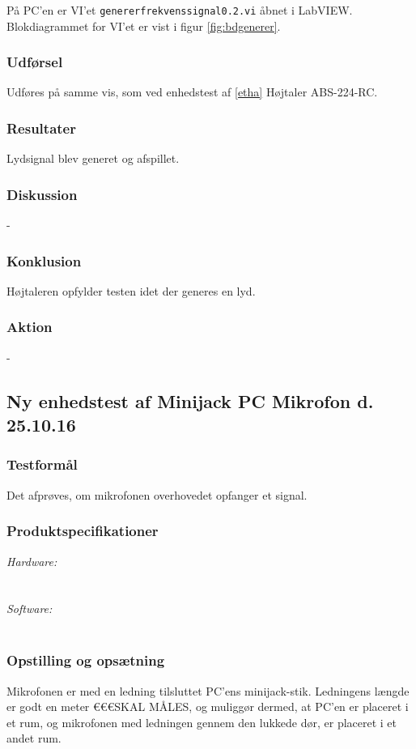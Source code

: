 		På PC'en er VI'et \texttt{genererfrekvenssignal0.2.vi} åbnet i LabVIEW. Blokdiagrammet for VI'et er vist i figur \ref{fig:bdgenerer}.   \\   
	
		
	
		\subsubsection{Udførsel}
			Udføres på samme vis, som ved enhedstest af \ref{etha} Højtaler ABS-224-RC. 
			
		\subsubsection{Resultater}
		Lydsignal blev generet og afspillet. 
		\subsubsection{Diskussion} 
		-
		\subsubsection{Konklusion}
		Højtaleren opfylder testen idet der generes en lyd. 
		\subsubsection{Aktion}
		- 
		
		\subsection{Ny enhedstest af Minijack PC Mikrofon d. 25.10.16}
		\subsubsection{Testformål}
		Det afprøves, om mikrofonen overhovedet opfanger et signal.
		\subsubsection{Produktspecifikationer}
	
			\textit{Hardware:}\\
			\mikrofon\\
			\PC\\
	
			\textit{Software:}\\
			\labview\\
	
		\subsubsection{Opstilling og opsætning}
		Mikrofonen er med en ledning tilsluttet PC'ens minijack-stik. Ledningens længde er godt en meter €€€SKAL MÅLES, og muliggør dermed, at PC'en er placeret i et rum, og mikrofonen med ledningen gennem den lukkede dør, er placeret i et andet rum. 
	
